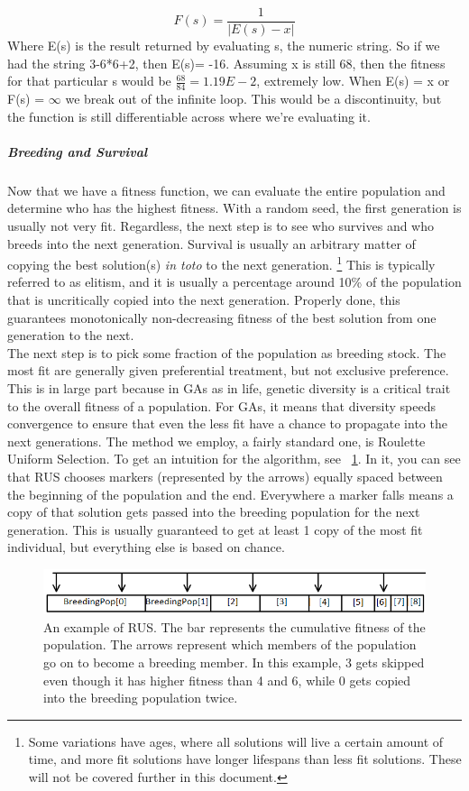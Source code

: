 \begin{equation*}
F(s) = \frac{1}{|E(s)-x|}
\end{equation*}
Where E(s) is the result returned by evaluating s, the numeric string.  So if we had the string 3-6*6+2, then E(s)= -16.  Assuming x is still 68, then the fitness for that particular s would be \(\frac{68}{84}= 1.19E-2\), extremely low. When 
E(s) = x or F(s) = ${\infty}$
we break out of the infinite loop.  This would be a discontinuity, but the function is still differentiable across where we're evaluating it.
\subparagraph{Breeding and Survival}
Now that we have a fitness function, we can evaluate the entire population and determine who has the highest fitness.  With a random seed, the first generation is usually not very fit.  Regardless, the next step is to see who survives and who breeds into the next generation.
Survival is usually an arbitrary matter of copying the best solution(s) \textit{in toto} to the next generation.  \footnote{Some variations have ages, where all solutions will live a certain amount of time, and more fit solutions have longer lifespans than less fit solutions.  These will not be covered further in this document.}  This is typically referred to as elitism, and it is usually a percentage around 10\% of the population that is uncritically copied into the next generation.  Properly done, this guarantees monotonically non-decreasing fitness of the best solution from one generation to the next.\\
The next step is to pick some fraction of the population as breeding stock.  The most fit are generally given preferential treatment, but not exclusive preference.  This is in large part because in GAs as in life, genetic diversity is a critical trait to the overall fitness of a population.  For GAs, it means that diversity speeds convergence to ensure that even the less fit have a chance to propagate into the next generations.  The method we employ, a fairly standard one, is Roulette Uniform Selection.  To get an intuition for the algorithm, see ~\ref{fig:rusillustration}.  In it, you can see that RUS chooses markers (represented by the arrows) equally spaced between the beginning of the population and the end.  Everywhere a marker falls means a copy of that solution gets passed into the breeding population for the next generation.  This is usually guaranteed to get at least 1 copy of the most fit individual, but everything else is based on chance.  
\begin{figure}
	\centering
	\includegraphics[width=0.7\linewidth]{figures/png/RUSIllustration}
	\caption[Roullete Uniform Selection]{An example of RUS. The bar represents the cumulative fitness of the population. The arrows represent which members of the population go on to become a breeding member.  In this example, 3 gets skipped even though it has higher fitness than 4 and 6, while 0 gets copied into the breeding population twice.}
	\label{fig:rusillustration}
	
\end{figure}

